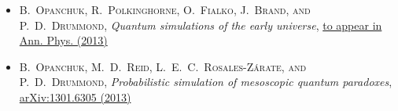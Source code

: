 \begin{itemize}
\item[\hfleuron] \textsc{B.~Opanchuk, R.~Polkinghorne, O.~Fialko, J.~Brand, \textnormal{and} P.~D.~Drummond}, \textit{Quantum simulations of the early universe}, \href{http://dx.doi.org/doi:10.1002/andp.201300113}{to appear in Ann. Phys. (2013)}

\item[\hfleuron] \textsc{B.~Opanchuk, M.~D.~Reid, L.~E.~C.~Rosales-Z\'arate, \textnormal{and} P.~D.~Drummond}, \textit{Probabilistic simulation of mesoscopic quantum paradoxes}, \href{http://arxiv.org/abs/1301.6305}{arXiv:1301.6305 (2013)}
\end{itemize}
